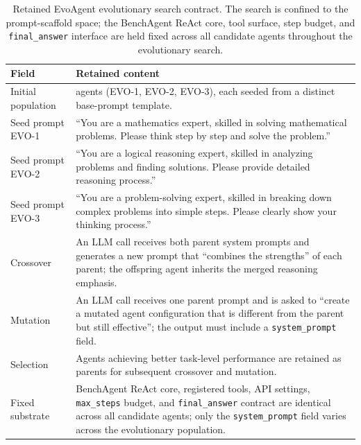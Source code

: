 \begin{table}[t]
    \centering
    \caption{Retained EvoAgent evolutionary search contract. The search is confined to the prompt-scaffold space; the BenchAgent ReAct core, tool surface, step budget, and \texttt{final\_answer} interface are held fixed across all candidate agents throughout the evolutionary search.}
    \label{tab:appendix_evoagent_contract}
    \footnotesize
    \setlength{\tabcolsep}{4pt}
    \renewcommand{\arraystretch}{1.12}
    \begin{tabular}{>{\raggedright\arraybackslash}p{} >{\raggedright\arraybackslash}p{}}
        \toprule
        \textbf{Field} & \textbf{Retained content} \\
        \midrule
        Initial population & 3 agents (EVO-1, EVO-2, EVO-3), each seeded from a distinct base-prompt template. \\
        Seed prompt EVO-1 & ``You are a mathematics expert, skilled in solving mathematical problems. Please think step by step and solve the problem.'' \\
        Seed prompt EVO-2 & ``You are a logical reasoning expert, skilled in analyzing problems and finding solutions. Please provide detailed reasoning process.'' \\
        Seed prompt EVO-3 & ``You are a problem-solving expert, skilled in breaking down complex problems into simple steps. Please clearly show your thinking process.'' \\
        Crossover & An LLM call receives both parent system prompts and generates a new prompt that ``combines the strengths'' of each parent; the offspring agent inherits the merged reasoning emphasis. \\
        Mutation & An LLM call receives one parent prompt and is asked to ``create a mutated agent configuration that is different from the parent but still effective''; the output must include a \texttt{system\_prompt} field. \\
        Selection & Agents achieving better task-level performance are retained as parents for subsequent crossover and mutation. \\
        Fixed substrate & BenchAgent ReAct core, registered tools, API settings, \texttt{max\_steps} budget, and \texttt{final\_answer} contract are identical across all candidate agents; only the \texttt{system\_prompt} field varies across the evolutionary population. \\
        \bottomrule
    \end{tabular}
    \renewcommand{\arraystretch}{1.0}
\end{table}

